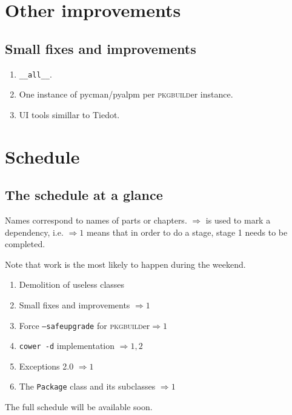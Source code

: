 \documentclass[a4paper,english]{book}
\numberwithin{equation}{section}
\newcommand{\pb}[0]{\textsc{pkgbuild}er}
\newcommand{\p}[1]{\nohyphens{\texttt{#1}}}
\begin{document}
\part{Other improvements}

\chapter{Small fixes and improvements}
\begin{enumerate}
\item \p{\_\_all\_\_}.
\item One instance of pycman/pyalpm per \pb{} instance.
\item UI tools simillar to Tiedot.
\end{enumerate}

\part{Schedule}

\chapter{The schedule at a glance}

Names correspond to names of parts or chapters.  \(\Rightarrow\) is used to mark a dependency, i.e. \(\Rightarrow 1\) means that in order to do a stage, stage 1 needs to be completed.

Note that work is the most likely to happen during the weekend.

\begin{enumerate}
\item Demolition of useless classes
\item Small fixes and improvements \(\Rightarrow 1\)
\item Force \p{--safeupgrade} for \pb \(\Rightarrow 1\)
\item \p{cower -d} implementation \(\Rightarrow 1, 2\)
\item Exceptions 2.0 \(\Rightarrow 1\)
\item The \p{Package} class and its subclasses \(\Rightarrow 1\)
\end{enumerate}

The full schedule will be available soon.
\end{document}
